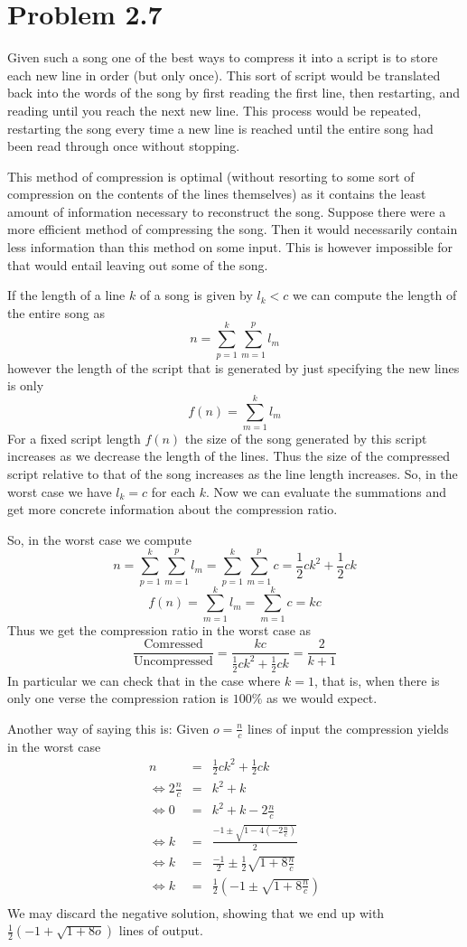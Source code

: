 \documentclass{article}
\begin{document}
\section{Problem 2.7}
Given such a song one of the best ways to compress it into a script is to store each new line in order (but only once). This sort of script would be translated back into the words of the song by first reading the first line, then restarting, and reading until you reach the next new line. This process would be repeated, restarting the song every time a new line is reached until the entire song had been read through once without stopping.

This method of compression is optimal (without resorting to some sort of compression on the contents of the lines themselves) as it contains the least amount of information necessary to reconstruct the song. Suppose there were a more efficient method of compressing the song. Then it would necessarily contain less information than this method on some input. This is however impossible for that would entail leaving out some of the song.

If the length of a line $k$ of a song is given by $l_k<c$ we can compute the length of the entire song as
\[n=\sum_{p=1}^k \sum_{m=1}^p l_m\]
however the length of the script that is generated by just specifying the new lines is only
\[f(n)=\sum_{m=1}^k l_m\]
For a fixed script length $f(n)$ the size of the song generated by this script increases as we decrease the length of the lines. Thus the size of the compressed script relative to that of the song increases as the line length increases. So, in the worst case we have $l_k=c$ for each $k$. Now we can evaluate the summations and get more concrete information about the compression ratio.

So, in the worst case we compute
\[n=\sum_{p=1}^k \sum_{m=1}^p l_m=\sum_{p=1}^k \sum_{m=1}^p c= \frac{1}{2} c k^2 + \frac{1}{2} c k\]
\[f(n)=\sum_{m=1}^k l_m=\sum_{m=1}^k c=k c\]
Thus we get the compression ratio in the worst case as
\[\frac{\mathrm{Comressed}}{\mathrm{Uncompressed}}=\frac{k c}{ \frac{1}{2} c k^2 + \frac{1}{2} c k}=\frac{2 }{  k +  1 }\]
In particular we can check that in the case where $k=1$, that is, when there is only one verse the compression ration is $100\%$ as we would expect.

Another way of saying this is: Given $o=\frac{n}{c}$ lines of input the compression yields in the worst case
\begin{eqnarray*}
n&=& \frac{1}{2} c k^2 + \frac{1}{2} c k\\
\Leftrightarrow 2 \frac{n}{c} &=&   k^2 +  k\\
\Leftrightarrow 0 &=&   k^2 +  k -2 \frac{n}{c}\\
\Leftrightarrow k &=&   \frac{-1\pm\sqrt{1-4(-2\frac{n}{c})}}{2}\\
\Leftrightarrow k &=&   \frac{-1}{2} \pm \frac{1}{2}\sqrt{1+8\frac{n}{c}}\\
\Leftrightarrow k &=&   \frac{1}{2}\left( -1 \pm \sqrt{1+8\frac{n}{c}}\right)\\
\end{eqnarray*}
We may discard the negative solution, showing that we end up with $ \frac{1}{2}\left( -1 + \sqrt{1+8 o}\right)$ lines of output.
\end{document}
